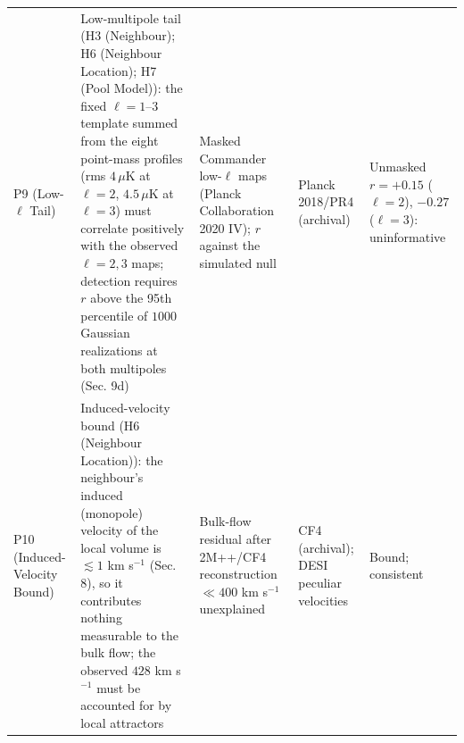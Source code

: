 \documentclass[
]{article}
\begin{document}
\begin{longtable}[]{@{}lllll@{}}
\begin{minipage}[t]{0.11\columnwidth}\raggedright
P9 (Low-\(\ell\) Tail)\strut
\end{minipage} & \begin{minipage}[t]{0.19\columnwidth}\raggedright
Low-multipole tail (H3 (Neighbour); H6 (Neighbour Location); H7 (Pool
Model)): the fixed \(\ell = 1\)--\(3\) template summed from the eight
point-mass profiles (rms \(4\,\mu\)K at \(\ell = 2\), \(4.5\,\mu\)K at
\(\ell = 3\)) must correlate positively with the observed
\(\ell = 2, 3\) maps; detection requires \(r\) above the 95th percentile
of \(1000\) Gaussian realizations at both multipoles (Sec. 9d)\strut
\end{minipage} & \begin{minipage}[t]{0.19\columnwidth}\raggedright
Masked Commander low-\(\ell\) maps (Planck Collaboration 2020 IV); \(r\)
against the simulated null\strut
\end{minipage} & \begin{minipage}[t]{0.19\columnwidth}\raggedright
Planck 2018/PR4 (archival)\strut
\end{minipage} & \begin{minipage}[t]{0.19\columnwidth}\raggedright
Unmasked \(r = +0.15\) (\(\ell=2\)), \(-0.27\) (\(\ell=3\)):
uninformative\strut
\end{minipage}\tabularnewline
\begin{minipage}[t]{0.11\columnwidth}\raggedright
P10 (Induced-Velocity Bound)\strut
\end{minipage} & \begin{minipage}[t]{0.19\columnwidth}\raggedright
Induced-velocity bound (H6 (Neighbour Location)): the neighbour's
induced (monopole) velocity of the local volume is \(\lesssim 1\) km
s\(^{-1}\) (Sec. 8), so it contributes nothing measurable to the bulk
flow; the observed \(428\) km s\(^{-1}\) must be accounted for by local
attractors\strut
\end{minipage} & \begin{minipage}[t]{0.19\columnwidth}\raggedright
Bulk-flow residual after 2M++/CF4 reconstruction \(\ll 400\) km
s\(^{-1}\) unexplained\strut
\end{minipage} & \begin{minipage}[t]{0.19\columnwidth}\raggedright
CF4 (archival); DESI peculiar velocities\strut
\end{minipage} & \begin{minipage}[t]{0.19\columnwidth}\raggedright
Bound; consistent\strut
\end{minipage}\tabularnewline
\bottomrule
\end{longtable}
\end{document}
